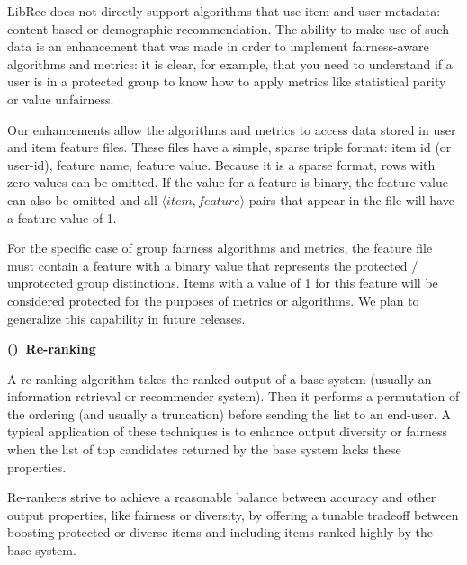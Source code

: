 \label{subsubsec:libauto_item_user_features}
LibRec does not directly support algorithms that use item and user metadata: content-based or demographic recommendation. The ability to make use of such data is an enhancement that was made in order to implement fairness-aware algorithms and metrics: it is clear, for example, that you need to understand if a user is in a protected group to know how to apply metrics like statistical parity or value unfairness. 

Our enhancements allow the algorithms and metrics to access data stored in user and item feature files. These files have a simple, sparse triple format: item id (or user-id), feature name, feature value. Because it is a sparse format, rows with zero values can be omitted. If the value for a feature is binary, the feature value can also be omitted and all $ \langle item, feature \rangle$ pairs that appear in the file will have a feature value of 1.

For the specific case of group fairness algorithms and metrics, the feature file must contain a feature with a binary value that represents the protected / unprotected group distinctions. Items with a value of 1 for this feature will be considered protected for the purposes of metrics or algorithms. We plan to generalize this capability in future releases.


\vspace{0.25cm}
\noindent \textbf{()~Re-ranking}
\vspace{0.25cm}
\label{subsubsec:libauto_rerank}

A re-ranking algorithm takes the ranked output of a base system (usually an information retrieval or recommender system). Then it performs a permutation of the ordering (and usually a truncation) before sending the list to an end-user. A typical application of these techniques is to enhance output diversity or fairness when the list of top candidates returned by the base system lacks these properties.

Re-rankers strive to achieve a reasonable balance between accuracy and other output properties, like fairness or diversity, by offering a tunable tradeoff between boosting protected or diverse items and including items ranked highly by the base system. 

